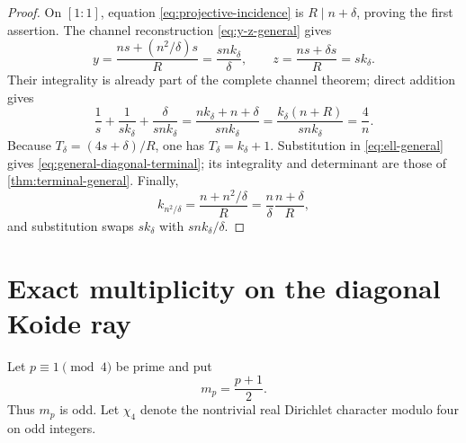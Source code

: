 \documentclass[11pt]{article}
\theoremstyle{definition}
\theoremstyle{remark}
\newcommand{\1}{\mathbf 1}
\begin{document}
\begin{proof}
On $[1:1]$, equation \eqref{eq:projective-incidence} is
$R\mid n+\delta$, proving the first assertion.  The channel reconstruction
\eqref{eq:y-z-general} gives
\[
 y=\frac{ns+(n^2/\delta)s}{R}=\frac{snk_\delta}{\delta},
 \qquad
 z=\frac{ns+\delta s}{R}=sk_\delta.
\]
Their integrality is already part of the complete channel theorem; direct
addition gives
\[
 \frac1s+\frac1{sk_\delta}+\frac{\delta}{snk_\delta}
 =\frac{nk_\delta+n+\delta}{snk_\delta}
 =\frac{k_\delta(n+R)}{snk_\delta}=\frac4n.
\]
Because $T_\delta=(4s+\delta)/R$, one has
$T_\delta=k_\delta+1$.  Substitution in \eqref{eq:ell-general} gives
\eqref{eq:general-diagonal-terminal}; its integrality and determinant are
those of \cref{thm:terminal-general}.  Finally,
\[
 k_{n^2/\delta}
 =\frac{n+n^2/\delta}{R}
 =\frac n\delta\frac{n+\delta}{R},
\]
and substitution swaps $sk_\delta$ with $snk_\delta/\delta$.
\end{proof}

\section{Exact multiplicity on the diagonal Koide ray}

Let $p\equiv1\pmod4$ be prime and put
\begin{equation}\label{eq:diag-m}
 m_p=\frac{p+1}{2}.
\end{equation}
Thus $m_p$ is odd.  Let $\chi_4$ denote the nontrivial real Dirichlet
character modulo four on odd integers.
\end{document}
